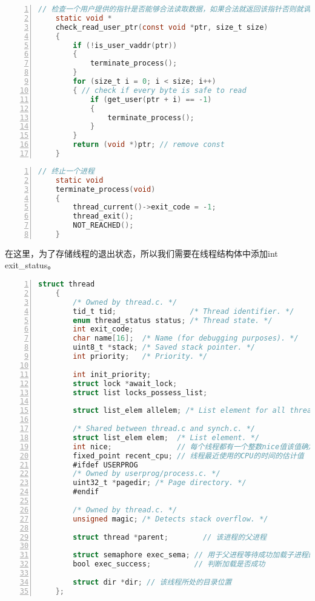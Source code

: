 \documentclass{article}
\begin{document}
	\begin{lstlisting}[xleftmargin = 4em,xrightmargin = 4em, aboveskip = 1em, numbers = left, language = C,title=src/syscall.c - \texttt{check\_read\_user\_ptr()}]
    // 检查一个用户提供的指针是否能够合法读取数据，如果合法就返回该指针否则就调用terminate_process
    static void *
    check_read_user_ptr(const void *ptr, size_t size)
    {
    	if (!is_user_vaddr(ptr))
    	{
    		terminate_process();
    	}
    	for (size_t i = 0; i < size; i++)
    	{ // check if every byte is safe to read
    		if (get_user(ptr + i) == -1)
    		{
    			terminate_process();
    		}
    	}
    	return (void *)ptr; // remove const
    }
	\end{lstlisting}
	
	\begin{lstlisting}[xleftmargin = 4em,xrightmargin = 4em, aboveskip = 1em, numbers = left, language = C,title=src/userprog/syscall.c - \texttt{terminate\_process()}]
    // 终止一个进程
    static void
    terminate_process(void)
    {
    	thread_current()->exit_code = -1;
    	thread_exit();
    	NOT_REACHED();
    }
	\end{lstlisting}
	
	在这里，为了存储线程的退出状态，所以我们需要在线程结构体中添加int exit\_status。
	
	\begin{lstlisting}[xleftmargin = 4em,xrightmargin = 4em, aboveskip = 1em, numbers = left, language = C,title=src/threads/thread.h中的结构体]
    struct thread
    {
    	/* Owned by thread.c. */
    	tid_t tid;                 /* Thread identifier. */
    	enum thread_status status; /* Thread state. */
    	int exit_code;
    	char name[16];  /* Name (for debugging purposes). */
    	uint8_t *stack; /* Saved stack pointer. */
    	int priority;   /* Priority. */
    	
    	int init_priority;
    	struct lock *await_lock;
    	struct list locks_possess_list;
    	
    	struct list_elem allelem; /* List element for all threads list. */
    	
    	/* Shared between thread.c and synch.c. */
    	struct list_elem elem;  /* List element. */
    	int nice;               // 每个线程都有一个整数nice值该值确定该线程与其他线程应该有多“不错”[-20,20]
    	fixed_point recent_cpu; // 线程最近使用的CPU的时间的估计值
    	#ifdef USERPROG
    	/* Owned by userprog/process.c. */
    	uint32_t *pagedir; /* Page directory. */
    	#endif
    	
    	/* Owned by thread.c. */
    	unsigned magic; /* Detects stack overflow. */
    	
    	struct thread *parent;        // 该进程的父进程
    	
    	struct semaphore exec_sema; // 用于父进程等待成功加载子进程的可执行文件时的阻塞
    	bool exec_success;          // 判断加载是否成功
    	
    	struct dir *dir; // 该线程所处的目录位置
    };
	\end{lstlisting}
	
\end{document}
